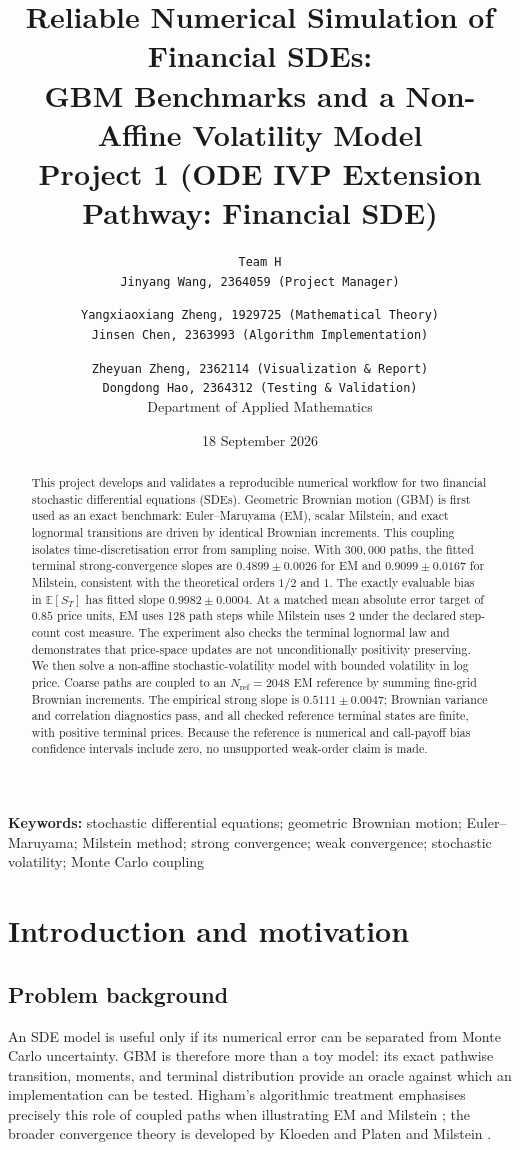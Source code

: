 \documentclass[11pt,a4paper]{article}
\title{\textbf{Reliable Numerical Simulation of Financial SDEs:}\\
\textbf{GBM Benchmarks and a Non-Affine Volatility Model}\\[2mm]
\large Project 1 (ODE IVP Extension Pathway: Financial SDE)}
\author{
  \texttt{Team H}\\
  \small \texttt{Jinyang Wang, 2364059 (Project Manager)} \and
  \texttt{Yangxiaoxiang Zheng, 1929725 (Mathematical Theory)}\\
  \small \texttt{Jinsen Chen, 2363993 (Algorithm Implementation)} \and
  \texttt{Zheyuan Zheng, 2362114 (Visualization \& Report)}\\
  \small \texttt{Dongdong Hao, 2364312 (Testing \& Validation)}\\
  \small Department of Applied Mathematics
}
\date{18 September 2026}
\theoremstyle{definition}
\theoremstyle{remark}
\begin{document}
\maketitle

\begin{abstract}
This project develops and validates a reproducible numerical workflow for two
financial stochastic differential equations (SDEs).  Geometric Brownian motion
(GBM) is first used as an exact benchmark: Euler--Maruyama (EM), scalar Milstein,
and exact lognormal transitions are driven by identical Brownian increments.
This coupling isolates time-discretisation error from sampling noise.  With
$300{,}000$ paths, the fitted terminal strong-convergence slopes are
$0.4899\pm0.0026$ for EM and $0.9099\pm0.0167$ for Milstein, consistent with the
theoretical orders $1/2$ and $1$.  The exactly evaluable bias in
$\mathbb{E}[S_T]$ has fitted slope $0.9982\pm0.0004$.  At a matched mean absolute
error target of $0.85$ price units, EM uses 128 path steps while Milstein uses
2 under the declared step-count cost measure.  The experiment also checks the
terminal lognormal law and demonstrates that price-space updates are not
unconditionally positivity preserving.  We then solve a non-affine
stochastic-volatility model with bounded volatility in log price.  Coarse paths are coupled to an
$N_{\mathrm{ref}}=2048$ EM reference by summing fine-grid Brownian increments.
The empirical strong slope is $0.5111\pm0.0047$; Brownian variance and
correlation diagnostics pass, and all checked reference terminal states are
finite, with positive terminal prices.  Because the reference is numerical and call-payoff bias
confidence intervals include zero, no unsupported weak-order claim is made.
\end{abstract}

\noindent\textbf{Keywords:} stochastic differential equations; geometric
Brownian motion; Euler--Maruyama; Milstein method; strong convergence; weak
convergence; stochastic volatility; Monte Carlo coupling

\tableofcontents
\newpage

\section{Introduction and motivation}

\subsection{Problem background}
An SDE model is useful only if its numerical error can be separated from Monte
Carlo uncertainty.  GBM is therefore more than a toy model: its exact pathwise
transition, moments, and terminal distribution provide an oracle against which
an implementation can be tested.  Higham's algorithmic treatment emphasises
precisely this role of coupled paths when illustrating EM and Milstein
\cite{higham2001}; the broader convergence theory is developed by Kloeden and
Platen \cite{kloedenplaten1992} and Milstein \cite{milstein1995}.
\end{document}
